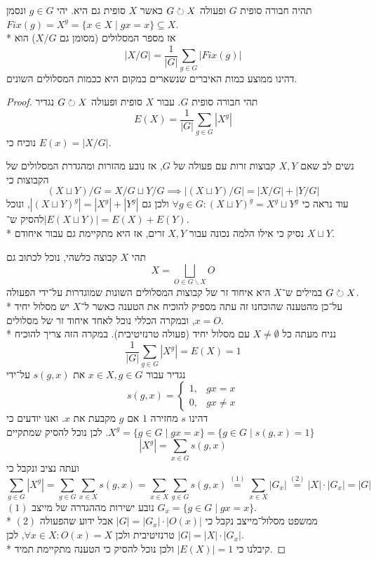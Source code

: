 \begin{lemma}
	תהיה חבורה סופית $G$ ופעולה $G \circlearrowright X$ כאשר $X$ סופית גם היא.
	יהי $g \in G$ ונסמן $Fix(g) = X^g = \{ x \in X \mid gx = x\} \subseteq X$. \\*
	אז מספר המסלולים (מסומן גם $X/G$) הוא
	\[
		|X/G| = \frac{1}{|G|} \sum_{g \in G} |Fix(g)|
	\]
	דהינו ממוצע כמות האיברים שנשארים במקום היא ככמות המסלולים השונים.
\end{lemma}
\begin{proof}
	תהי חבורה סופית $G$. עבור $X$ סופית ופעולה $G \circlearrowright X$ נגדיר
	\[
		E(X) = \frac{1}{|G|} \sum_{g \in G} |X^g|
	\]
	נוכיח כי $E(x) = |X/G|$.

	נשים לב שאם $X, Y$ קבוצות זרות עם פעולה של $G$, אז נובע מהזרות ומהגדרת המסלולים של הקבוצות כי
	\[
		(X \sqcup Y)/G = X/G \sqcup Y/G
		\implies
		|(X \sqcup Y)/G| = |X/G| + |Y/G|
	\]
	עוד נראה כי	$\forall g \in G : {(X \sqcup Y)}^g = X^g \sqcup Y^g$
	ולכן גם $|{(X \sqcup Y)}^g| = |X^g| + |Y^g|$,
	ונוכל להסיק ש־$|E(X \sqcup Y)| = E(X) + E(Y)$. \\*
	נסיק כי אילו הלמה נכונה עבור $X, Y$ זרים, אז היא מתקיימת גם עבור איחודם $X \sqcup Y$.

	תהי $X$ קבוצה כלשהי, נוכל לכתוב גם
	\[
		X = \bigsqcup_{O \in G\backslash X} O
	\]
	במילים ש־$X$ היא איחוד זר של קבוצות המסלולים השונות שמוגדרות על־ידי הפעולה $G \circlearrowright X$. \\*
	על־כן מהטענה שהוכחנו זה עתה מספיק להוכיח את הטענה כאשר ל־$X$ יש מסלול יחיד $x = O$, ובמקרה הכללי נוכל לאחד איחוד זר של מסלולים. \\*
	נניח מעתה כל $X \ne \emptyset$ עם מסלול יחיד (פעולה טרנזיטיבית).
	במקרה הזה צריך להוכיח
	\[
		\frac{1}{|G|} \sum_{g \in G} |X^g| = E(X) = 1
	\]
	נגדיר עבור $x \in X, g \in G$ את $s(g, x)$ על־ידי
	\[
		s(g, x) = \begin{cases}
			1, & gx = x \\
			0, & gx \ne x
		\end{cases}
	\]
	דהינו $s$ מחזירה $1$ אם $g$ מקבעת את $x$. ואנו יודעים כי $X^g = \{ g \in G \mid gx = x \} = \{ g \in G \mid s(g, x) = 1 \}$.
	לכן נוכל להסיק שמתקיים
	\[
		|X^g| = \sum_{x \in G} s(g, x)
	\]
	ועתה נציב ונקבל כי
	\[
		\sum_{g \in G} |X^g|
		= \sum_{g \in G} \sum_{x \in X} s(g, x)
		= \sum_{x \in X} \sum_{g \in G}  s(g, x)
		\overset{(1)}{=} \sum_{x \in X} |G_x|
		\overset{(2)}{=} |X| \cdot |G_x| = |G|
	\]
	$(1)$ נובע ישירות מההגדרה של מייצב $G_x = \{ g \in G \mid g x = x\}$. \\*
	$(2)$ ממשפט מסלול־מייצב נקבל כי $|G| = |G_x| \cdot |O(x)|$ אבל ידוע שהפעולה טרנזיטיבית ולכן $\forall x \in X: O(x) = X$, לכן $|G| = |X| \cdot |G_x|$. \\*
	קיבלנו כי $|E(X)| = 1$ ולכן נוכל להסיק כי הטענה מתקיימת תמיד.
\end{proof}
